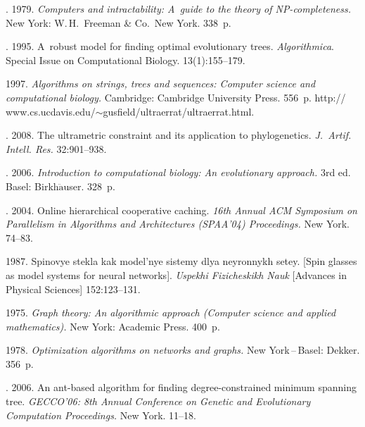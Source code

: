   \begin{multicols}{2}

\renewcommand{\bibname}{\protect\rmfamily References}

{\small\frenchspacing
{%
\begin{thebibliography}{99}


. 1979.
\textit{Computers and intractability: A~guide to the theory of NP-completeness. }
New York: W.\,H.~Freeman \& Co.\ New York. 338~p.

. 1995.
A~robust model for finding optimal evolutionary trees.
\textit{Algorithmica}. Special Issue on Computational Biology.
13(1):155--179.

 1997.
\textit{Algorithms on strings, trees and sequences: Computer science and
computational biology. } Cambridge:
Cambridge University Press. 556~p.
{\sf http:// www.cs.ucdavis.edu/$\sim$gusfield/ultraerrat/ultraerrat.\linebreak html}.


. 2008.
The ultrametric constraint and its application to phylogenetics.
\textit{J.~Artif. Intell. Res.} 32:901--938.

. 2006.
\textit{Introduction to computational biology: An evolutionary approach.}
3rd ed. Basel: Birkh$\ddot{\mbox{a}}$user. 328~p.

. 2004.
Online hierarchical cooperative caching.
\textit{16th Annual ACM Symposium on Parallelism in Algorithms and
Architectures (SPAA'04) Proceedings.}
New York. 74--83.

 1987.
Spinovye stekla kak model'nye sistemy dlya neyronnykh setey.
[Spin glasses as model systems for neural networks].
\textit{Uspekhi Fizicheskikh Nauk}
[Advances in Physical Sciences] 152:123--131.

 1975.
\textit{Graph theory: An algorithmic approach
(Computer science and applied mathematics).}
New York: Academic Press. 400~p.

 1978.
\textit{Optimization algorithms on networks and graphs.}
New York\,--\,Basel: Dekker. 356~p.

. 2006.
An ant-based algorithm for finding degree-constrained minimum spanning tree.
\textit{GECCO'06: 8th Annual Conference on Genetic and Evolutionary Computation Proceedings.}
New York. 11--18.
{

}

\end{thebibliography}
} }


\end{multicols}

